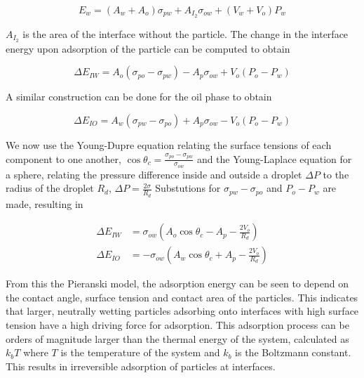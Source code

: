 \begin{equation}
    E_w = (A_w + A_o)\sigma_{pw} + A_{I_2}\sigma_{ow} + (V_w + V_o)P_w
\end{equation}

$A_{I_2}$ is the area of the interface without the particle. The change in the interface energy upon adsorption of the particle can be computed to obtain

\begin{equation}
    \Delta E_{IW} = A_o(\sigma_{po} - \sigma_{pw}) - A_p\sigma_{ow} + V_o(P_o - P_w)
\end{equation}

A similar construction can be done for the oil phase to obtain 

\begin{equation}
    \Delta E_{IO} = A_w(\sigma_{pw} - \sigma_{po}) + A_p\sigma_{ow} - V_o(P_o - P_w)
\end{equation}

We now use the Young-Dupre equation relating the surface tensions of each component to one another, $\cos{\theta_c} = \frac{\sigma_{po} - \sigma_{pw}}{\sigma_{ow}}$ and the
Young-Laplace equation for a sphere, relating the pressure difference inside and outside a droplet $\Delta P$ to the radius of the droplet $R_d$, $\Delta P = \frac{2\sigma}{R_d}$
Substutions for $\sigma_{pw} - \sigma_{po}$ and $P_o - P_w$ are made, resulting in 

\begin{equation}
    \begin{split}
        \Delta E_{IW} &= \sigma_{ow}(A_o\cos{\theta_c} - A_p - \frac{2 V_o}{R_d}) \\
        \Delta E_{IO} &= -\sigma_{ow}(A_w\cos{\theta_c} + A_p - \frac{2 V_o}{R_d})
    \end{split}
\end{equation}

From this the Pieranski model, the adsorption energy can be seen to depend on the contact angle, surface tension and contact area of the particles. This indicates that larger, neutrally wetting
particles adsorbing onto interfaces with high surface tension have a high driving force for adsorption. \cite{ngai_particle-stabilized_2015,reeves_particle-size_2015} This adsorption process 
can be orders of magnitude larger than the thermal energy of the system, calculated as $k_b T$ where $T$ is the temperature of the system and $k_b$ is the Boltzmann constant. This results in 
irreversible adsorption of particles at interfaces. \cite{binks_pickering_2001}

